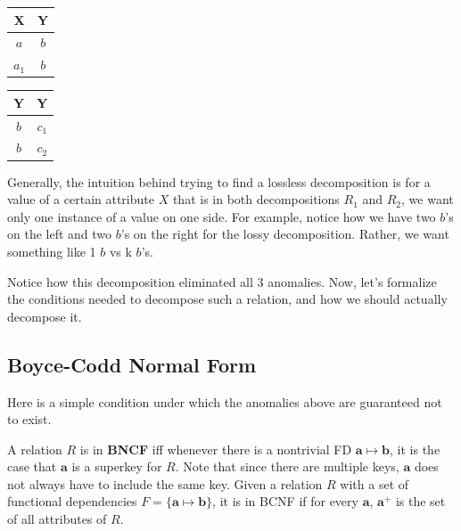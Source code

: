 \documentclass{article}
\begin{document}
\begin{example}
\begin{table}[H]
\begin{minipage}{.5\textwidth}
          \begin{tabular}{|c|c|}
            \hline
            \textbf{X} & \textbf{Y} \\
            \hline
            $a$ & $b$ \\
            $a_1$ & $b$ \\
            \hline
          \end{tabular}
          \label{tab:ex8}
        \end{minipage}
        \begin{minipage}{.5\textwidth}
          \centering
          \begin{tabular}{|c|c|}
            \hline
            \textbf{Y} & \textbf{Y} \\
            \hline
            $b$ & $c_1$ \\
            $b$ & $c_2$ \\
            \hline
          \end{tabular}
          \label{tab:ex9}
        \end{minipage}
      \end{table}
      Generally, the intuition behind trying to find a lossless decomposition is for a value of a certain attribute $X$ that is in both decompositions $R_1$ and $R_2$, we want only one instance of a value on one side. For example, notice how we have two $b$'s on the left and two $b$'s on the right for the lossy decomposition. Rather, we want something like 1 $b$ vs k $b$'s.
    \end{example}
  
    \begin{example}
      
    \end{example}

    Notice how this decomposition eliminated all 3 anomalies. Now, let's formalize the conditions needed to decompose such a relation, and how we should actually decompose it. 

  \subsection{Boyce-Codd Normal Form}

    Here is a simple condition under which the anomalies above are guaranteed not to exist. 

    \begin{definition}[BNCF]
      A relation $R$ is in \textbf{BNCF} iff whenever there is a nontrivial FD $\mathbf{a} \mapsto \mathbf{b}$, it is the case that $\mathbf{a}$ is a superkey for $R$. Note that since there are multiple keys, $\mathbf{a}$ does not always have to include the same key. Given a relation $R$ with a set of functional dependencies $F = \{\mathbf{a} \mapsto \mathbf{b}\}$, it is in BCNF if for every $\mathbf{a}$, $\mathbf{a}^+$ is the set of all attributes of $R$. 
    \end{definition}
\end{document}
